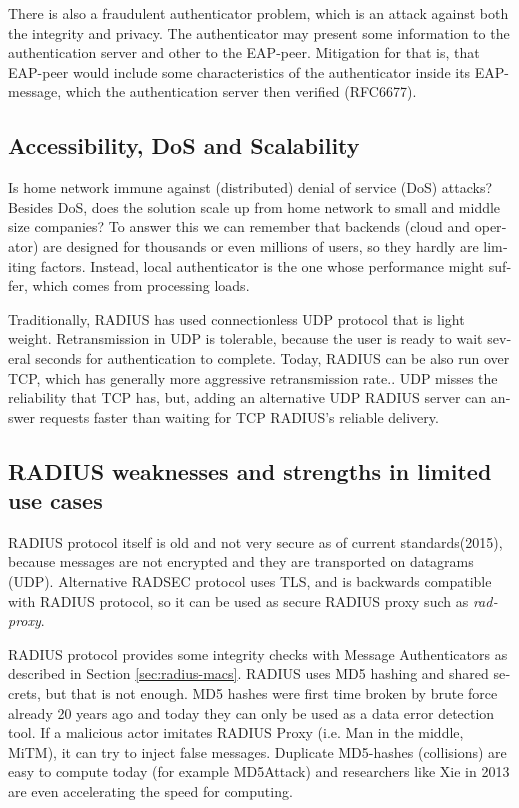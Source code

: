 \documentclass[12pt,a4paper,english]{tutthesis}
\begin{document}
\begin{otherlanguage}{english}
There is also a fraudulent authenticator problem, which is an attack
against both the integrity and privacy.  The authenticator may present
some information to the authentication server and other to the
EAP-peer. Mitigation for that is, that EAP-peer would include some
characteristics of the authenticator inside its EAP-message, which
the authentication server then verified (RFC6677)\cite{rfc6677}.

\subsection{Accessibility, DoS and Scalability}
\label{sec-6-1-3}

Is home network immune against (distributed) denial of service (DoS)
attacks? Besides DoS, does the solution scale up from home network to
small and middle size companies?
To answer this we can remember that backends (cloud and operator) are
designed for thousands or even millions of users, so 
they hardly are limiting factors. Instead, local
authenticator is the one whose performance might suffer, which
comes from processing loads\cite{2009-lin-simefficiency}.


Traditionally, RADIUS has used connection\-less UDP protocol that is
light weight. Retransmission in UDP is tolerable, because the user is
ready to wait several seconds for authentication to complete.  
Today, RADIUS can be also run over TCP, which has generally more
aggressive retransmission rate.\cite[Section 2.2.1]{rfc5080}.
UDP misses the reliability that TCP has, but, adding an alternative UDP RADIUS
server can answer requests faster than waiting for TCP RADIUS's reliable delivery.


\subsection{RADIUS weaknesses and strengths in limited use cases}
\label{sec-6-1-4}


RADIUS protocol itself is old and not very secure as of current
standards(2015), because messages are not encrypted and they are
transported on datagrams (UDP). Alternative RADSEC protocol uses TLS, and 
is backwards compatible with RADIUS protocol, so it can be used
as secure RADIUS proxy such as \emph{radproxy}\cite{uninett-radproxy}.

RADIUS protocol provides some integrity checks with Message
Authenticators as described in Section \ref{sec:radius-macs}.  RADIUS uses
MD5 hashing and shared secrets, but that is not enough.  MD5 hashes
were first time broken by brute force already 20 years ago and today
they can only be used as a data error detection
tool\cite[p.2]{rfc6151}.  If a malicious actor imitates RADIUS Proxy
(i.e. Man in the middle, MiTM), it can try to inject false messages.
Duplicate MD5-hashes (collisions) are easy to compute today (for 
example MD5Attack\cite{rfc5176}) and researchers like Xie in
2013\cite{xie2013fast}  are even accelerating the speed for
computing.


\end{otherlanguage}
\end{document}
